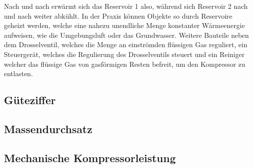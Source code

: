 Nach und nach erwärmt sich das Reservoir 1 also, während sich Reservoir 2 nach und nach weiter abkühlt.
In der Praxis können Objekte so durch Reservoire geheizt werden, welche eine nahezu unendliche Menge konstanter Wärmeenergie aufweisen, wie die Umgebungsluft oder das Grundwasser.
Weitere Bauteile neben dem Drosselventil, welches die Menge an einströmden flüssigen Gas reguliert, ein Steuergerät, welches die Regulierung des Drosselventils steuert und ein Reiniger welcher das flüssige Gas von gasförmigen Resten befreit, um den Kompressor zu entlasten.
\subsection{Güteziffer}
\subsection{Massendurchsatz}
\subsection{Mechanische Kompressorleistung}